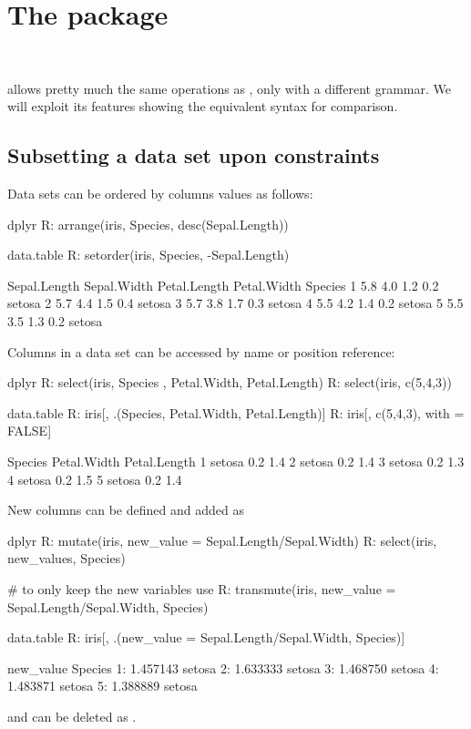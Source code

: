 \section{The  package}\label{sec: dplyr}
\\
\bigskip 

 allows pretty much the same operations as
, only with a different grammar. We
will exploit its features showing the equivalent
 syntax for comparison.

\subsection{Subsetting a data set upon constraints}
Data sets can be ordered by columns values as
follows:
\begin{example}
		dplyr
R: arrange(iris, Species, desc(Sepal.Length))
 
 		data.table
R: setorder(iris, Species, -Sepal.Length)
 
   Sepal.Length Sepal.Width Petal.Length Petal.Width Species
1          5.8         4.0          1.2         0.2  setosa
2          5.7         4.4          1.5         0.4  setosa
3          5.7         3.8          1.7         0.3  setosa
4          5.5         4.2          1.4         0.2  setosa
5          5.5         3.5          1.3         0.2  setosa
\end{example}

Columns in a data set can be accessed by name
or position reference:
\begin{example}
		dplyr
R: select(iris, Species , Petal.Width, Petal.Length)
R: select(iris, c(5,4,3))
 
		data.table
R: iris[, .(Species, Petal.Width, Petal.Length)]
R: iris[, c(5,4,3), with = FALSE]

   Species Petal.Width Petal.Length
1  setosa         0.2          1.4
2  setosa         0.2          1.4
3  setosa         0.2          1.3
4  setosa         0.2          1.5
5  setosa         0.2          1.4
\end{example}
New columns can be defined and added as
\begin{example}
		dplyr
R: mutate(iris, new_value = Sepal.Length/Sepal.Width)
R: select(iris, new_values, Species)

# to only keep the new variables use
R: transmute(iris, new_value = Sepal.Length/Sepal.Width, Species)

		data.table
R: iris[, .(new_value = Sepal.Length/Sepal.Width, Species)]

     new_value   Species
  1:  1.457143    setosa
  2:  1.633333    setosa
  3:  1.468750    setosa
  4:  1.483871    setosa
  5:  1.388889    setosa
\end{example}
and can be deleted as 
.
\bigskip

